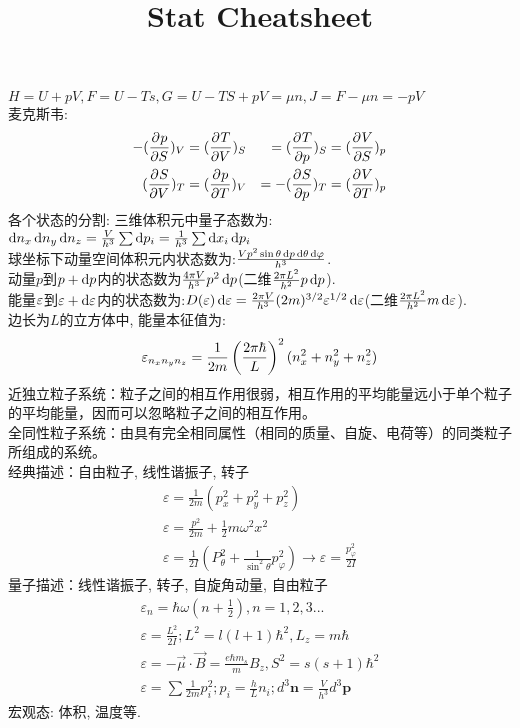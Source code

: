 \documentclass[UTF8,8pt]{ctexart}
\title{Stat Cheatsheet}
\newcommand{\q}[1]{{\color{red} #1}}
\begin{document}
 
\leftmargini=5mm
\raggedright
\footnotesize
\begin{multicols}{3}
$H=U+pV,F=U-Ts,G=U-TS+pV=\mu n,J=F-\mu n=-pV$\\
麦克斯韦:
$$\begin{aligned} 
		-(\frac{\partial^{} p}{\partial {S}^{}})_V &= (\frac{\partial^{} T}{\partial {V}^{}})_S&= 
		(\frac{\partial^{} T}{\partial {p}^{}})_S &= (\frac{\partial^{} V}{\partial {S}^{}})_p\\
		(\frac{\partial^{} S}{\partial {V}^{}})_T &= (\frac{\partial^{} p}{\partial {T}^{}})_V &=
		-(\frac{\partial^{} S}{\partial {p}^{}})_T &= (\frac{\partial^{} V}{\partial {T}^{}})_p
 \end{aligned}$$
各个状态的分割: 三维体积元中量子态数为: $\mathop{}\!\mathrm{d} n_x\mathop{}\!\mathrm{d} n_y\mathop{}\!\mathrm{d} n_z = \frac{V}{h^3}\sum \mathop{}\!\mathrm{d} p_i = \frac{1}{h^3}\sum \mathop{}\!\mathrm{d} x_i\mathop{}\!\mathrm{d} p_i$\\
球坐标下动量空间体积元内状态数为:$\frac{Vp^2\sin\theta\mathop{}\!\mathrm{d} p\mathop{}\!\mathrm{d} \theta \mathop{}\!\mathrm{d} \varphi}{h^3}$. \\
动量$p$到$p+\mathop{}\!\mathrm{d} p$内的状态数为$\frac{4\pi V}{h^3} p^2\mathop{}\!\mathrm{d} p$(二维$\frac{2\pi L^2}{h^2}p\mathop{}\!\mathrm{d} p$).\\
能量$\varepsilon$到$\varepsilon+\mathop{}\!\mathrm{d}\varepsilon$内的状态数为:$D(\varepsilon)\mathop{}\!\mathrm{d}\varepsilon=\frac{2\pi V}{h^3}(2m)^{3/2}\varepsilon^{1/2}\mathop{}\!\mathrm{d}\varepsilon$(二维$\frac{2\pi L^2}{h^2}m\mathop{}\!\mathrm{d}\varepsilon$).\\
边长为$L$的立方体中, \q{能量本征值}为:
$$\varepsilon_{n_xn_yn_z} = \frac{1}{2m}\left( \frac{2\pi \hbar}{L} \right)^2(n_x^2+n_y^2+n_z^2)$$
\q{近独立粒子系统}：粒子之间的相互作用很弱，相互作用的平均能量远小于单个粒子的平均能量，因而可以忽略粒子之间的相互作用。 \\
\q{全同性粒子系统}：由具有完全相同属性（相同的质量、自旋、电荷等）的同类粒子所组成的系统。\\
经典描述：自由粒子, 线性谐振子, 转子
$$\begin{array}{l}
		{\varepsilon=\frac{1}{2 m}\left(p_{x}^{2}+p_{y}^{2}+p_{z}^{2}\right)} \\
		{\varepsilon=\frac{p^{2}}{2 m}+\frac{1}{2} m \omega^{2} x^{2}}        \\
		{\varepsilon=\frac{1}{2 I}\left(P_{\theta}^{2}+\frac{1}{\sin ^{2} \theta} p_{\varphi}^{2}\right) \rightarrow \varepsilon=\frac{p_{\varphi}^{2}}{2 I}}
	\end{array}$$
量子描述：线性谐振子, 转子, 自旋角动量, 自由粒子
$$
	\begin{array}{l}
		{\varepsilon_{n}=\hbar \omega\left(n+\frac{1}{2}\right)}, n=1,2,3...                              \\
		{\varepsilon=\frac{L^{2}}{2 I} ; L^{2}=l(l+1) \hbar^{2}, L_{z}=m \hbar} \\
		{\varepsilon=-\vec{\mu} \cdot \vec{B}=\frac{e \hbar m_{s}}{m} B_{z}, S^2=s(s+1)\hbar^2}           \\
		{\varepsilon=\sum \frac{1}{2 m}p_i^2 ; p_{i}=\frac{h}{L} n_{i} ; d^3\bm{n}=\frac{V}{h^{3}} d^3 \bm{p}}
	\end{array}
$$
宏观态: 体积, 温度等.


\end{multicols}
\end{document}
